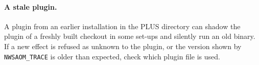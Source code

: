\paragraph{A stale plugin.} A plugin from an earlier installation in the PLUS directory can shadow the plugin of a freshly built checkout in some set-ups and silently run an old binary. If a new effect is refused as unknown to the plugin, or the version shown by \texttt{NWSAOM\_TRACE} is older than expected, check which plugin file is used.
